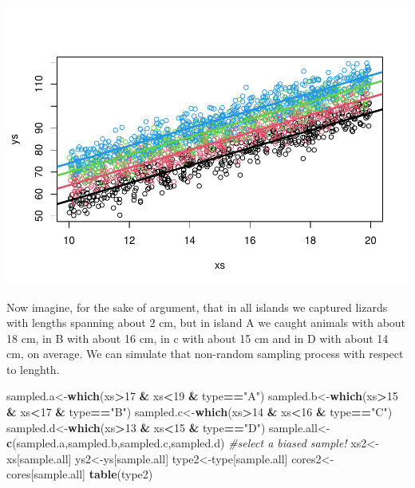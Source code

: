 \documentclass[
]{book}
\newenvironment{Shaded}{\begin{snugshade}}{\end{snugshade}}
\newcommand{\CommentTok}[1]{\textcolor[rgb]{0.56,0.35,0.01}{\textit{#1}}}
\newcommand{\DecValTok}[1]{\textcolor[rgb]{0.00,0.00,0.81}{#1}}
\newcommand{\FunctionTok}[1]{\textcolor[rgb]{0.13,0.29,0.53}{\textbf{#1}}}
\newcommand{\NormalTok}[1]{#1}
\newcommand{\OtherTok}[1]{\textcolor[rgb]{0.56,0.35,0.01}{#1}}
\newcommand{\SpecialCharTok}[1]{\textcolor[rgb]{0.81,0.36,0.00}{\textbf{#1}}}
\newcommand{\StringTok}[1]{\textcolor[rgb]{0.31,0.60,0.02}{#1}}
\begin{document}
\includegraphics{ECOMODbook_files/figure-latex/a10.9-1.pdf}

Now imagine, for the sake of argument, that in all islands we captured lizards with lengths spanning about 2 cm, but in island A we caught animals with about 18 cm, in B with about 16 cm, in c with about 15 cm and in D with about 14 cm, on average. We can simulate that non-random sampling process with respect to lenghth.

\begin{Shaded}
\begin{Highlighting}[]
\NormalTok{sampled.a}\OtherTok{\textless{}{-}}\FunctionTok{which}\NormalTok{(xs}\SpecialCharTok{\textgreater{}}\DecValTok{17} \SpecialCharTok{\&}\NormalTok{ xs}\SpecialCharTok{\textless{}}\DecValTok{19} \SpecialCharTok{\&}\NormalTok{ type}\SpecialCharTok{==}\StringTok{"A"}\NormalTok{)}
\NormalTok{sampled.b}\OtherTok{\textless{}{-}}\FunctionTok{which}\NormalTok{(xs}\SpecialCharTok{\textgreater{}}\DecValTok{15} \SpecialCharTok{\&}\NormalTok{ xs}\SpecialCharTok{\textless{}}\DecValTok{17} \SpecialCharTok{\&}\NormalTok{ type}\SpecialCharTok{==}\StringTok{"B"}\NormalTok{)}
\NormalTok{sampled.c}\OtherTok{\textless{}{-}}\FunctionTok{which}\NormalTok{(xs}\SpecialCharTok{\textgreater{}}\DecValTok{14} \SpecialCharTok{\&}\NormalTok{ xs}\SpecialCharTok{\textless{}}\DecValTok{16} \SpecialCharTok{\&}\NormalTok{ type}\SpecialCharTok{==}\StringTok{"C"}\NormalTok{)}
\NormalTok{sampled.d}\OtherTok{\textless{}{-}}\FunctionTok{which}\NormalTok{(xs}\SpecialCharTok{\textgreater{}}\DecValTok{13} \SpecialCharTok{\&}\NormalTok{ xs}\SpecialCharTok{\textless{}}\DecValTok{15} \SpecialCharTok{\&}\NormalTok{ type}\SpecialCharTok{==}\StringTok{"D"}\NormalTok{)}
\NormalTok{sample.all}\OtherTok{\textless{}{-}}\FunctionTok{c}\NormalTok{(sampled.a,sampled.b,sampled.c,sampled.d)}
\CommentTok{\#select a biased sample!}
\NormalTok{xs2}\OtherTok{\textless{}{-}}\NormalTok{xs[sample.all]}
\NormalTok{ys2}\OtherTok{\textless{}{-}}\NormalTok{ys[sample.all]}
\NormalTok{type2}\OtherTok{\textless{}{-}}\NormalTok{type[sample.all]}
\NormalTok{cores2}\OtherTok{\textless{}{-}}\NormalTok{cores[sample.all]}
\FunctionTok{table}\NormalTok{(type2)}
\end{Highlighting}
\end{Shaded}
\end{document}
